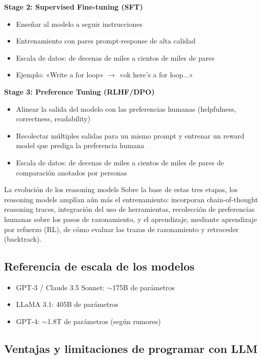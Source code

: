 \textbf{Stage 2: Supervised Fine-tuning (SFT)}
\begin{itemize}
    \item Enseñar al modelo a seguir instrucciones
    \item Entrenamiento con pares prompt-response de alta calidad
    \item Escala de datos: de decenas de miles a cientos de miles de pares
    \item Ejemplo: «Write a for loop» $\rightarrow$ «ok here's a for loop...»
\end{itemize}

\textbf{Stage 3: Preference Tuning (RLHF/DPO)}
\begin{itemize}
    \item Alinear la salida del modelo con las preferencias humanas (helpfulness, correctness, readability)
    \item Recolectar múltiples salidas para un mismo prompt y entrenar un reward model que prediga la preferencia humana
    \item Escala de datos: de decenas de miles a cientos de miles de pares de comparación anotados por personas
\end{itemize}

\begin{importantbox}{La evolución de los reasoning models}
Sobre la base de estas tres etapas, los reasoning models amplían aún más el entrenamiento: incorporan chain-of-thought reasoning traces, integración del uso de herramientas, recolección de preferencias humanas sobre los pasos de razonamiento, y el aprendizaje, mediante aprendizaje por refuerzo (RL), de cómo evaluar las trazas de razonamiento y retroceder (backtrack).
\end{importantbox}

\subsection{Referencia de escala de los modelos}

\begin{itemize}
    \item GPT-3 / Claude 3.5 Sonnet: $\sim$175B de parámetros
    \item LLaMA 3.1: 405B de parámetros
    \item GPT-4: $\sim$1.8T de parámetros (según rumores)
\end{itemize}

\subsection{Ventajas y limitaciones de programar con LLM}

